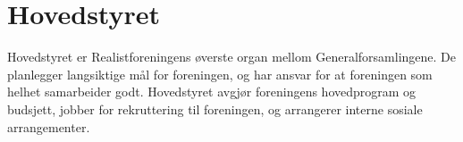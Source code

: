 \chapter{Hovedstyret}
Hovedstyret er Realistforeningens øverste organ mellom Generalforsamlingene.
De planlegger langsiktige mål for foreningen, og har ansvar for at
foreningen som helhet samarbeider godt. Hovedstyret avgjør foreningens
hovedprogram og budsjett, jobber for rekruttering til foreningen, og
arrangerer interne sosiale arrangementer.


